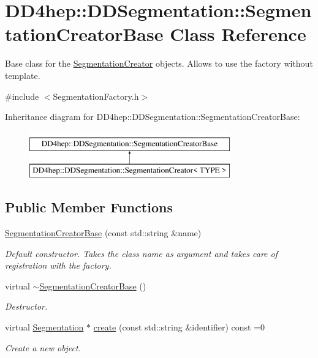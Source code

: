 \hypertarget{class_d_d4hep_1_1_d_d_segmentation_1_1_segmentation_creator_base}{}\section{D\+D4hep\+:\+:D\+D\+Segmentation\+:\+:Segmentation\+Creator\+Base Class Reference}
\label{class_d_d4hep_1_1_d_d_segmentation_1_1_segmentation_creator_base}


Base class for the \hyperlink{class_d_d4hep_1_1_d_d_segmentation_1_1_segmentation_creator}{Segmentation\+Creator} objects. Allows to use the factory without template.  




{\ttfamily \#include $<$Segmentation\+Factory.\+h$>$}

Inheritance diagram for D\+D4hep\+:\+:D\+D\+Segmentation\+:\+:Segmentation\+Creator\+Base\+:\begin{figure}[H]
\begin{center}
\leavevmode
\includegraphics[height=2.000000cm]{class_d_d4hep_1_1_d_d_segmentation_1_1_segmentation_creator_base}
\end{center}
\end{figure}
\subsection*{Public Member Functions}
\begin{DoxyCompactItemize}
\item 
\hyperlink{class_d_d4hep_1_1_d_d_segmentation_1_1_segmentation_creator_base_aaea0ce7f18f4a00718586fde3b214aaa}{Segmentation\+Creator\+Base} (const std\+::string \&name)
\begin{DoxyCompactList}\small\item\em Default constructor. Takes the class name as argument and takes care of registration with the factory. \end{DoxyCompactList}\item 
virtual \hyperlink{class_d_d4hep_1_1_d_d_segmentation_1_1_segmentation_creator_base_aa389c741b4df8a82ff944fed42b3dbf7}{$\sim$\+Segmentation\+Creator\+Base} ()
\begin{DoxyCompactList}\small\item\em Destructor. \end{DoxyCompactList}\item 
virtual \hyperlink{class_d_d4hep_1_1_d_d_segmentation_1_1_segmentation}{Segmentation} $\ast$ \hyperlink{class_d_d4hep_1_1_d_d_segmentation_1_1_segmentation_creator_base_aad60d04fe90588d97eeb8030f8d6daa3}{create} (const std\+::string \&identifier) const =0
\begin{DoxyCompactList}\small\item\em Create a new object. \end{DoxyCompactList}\end{DoxyCompactItemize}


